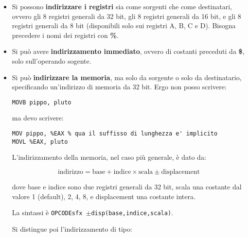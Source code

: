 \documentclass[a4paper,11pt]{article}
\begin{document}
\begin{itemize}
	\item 
Si possono \textbf{indirizzare i registri} sia come sorgenti che come destinatari, ovvero gli 8 registri generali da 32 bit, gli 8 registri generali da 16 bit, e gli 8 registri generali da 8 bit (disponibili solo sui registri A, B, C e D).
Bisogna precedere i nomi dei registri con \textbf{\%}.
	\item
Si può avere \textbf{indirizzamento immediato}, ovvero di costanti preceduti da \textbf{\$}, solo sull'operando sogente.
	\item
		Si può \textbf{indirizzare la memoria}, ma solo da sorgente o solo da destinatario, specificando un'indirizzo di memoria da 32 bit.
Ergo non posso scrivere:

\begin{lstlisting}[style=codestyle]	
MOVB pippo, pluto
\end{lstlisting}

ma devo scrivere:

\begin{lstlisting}[style=codestyle]	
MOV pippo, %EAX	% qua il suffisso di lunghezza e' implicito
MOVL %EAX, pluto
\end{lstlisting}

L'indirizzamento della memoria, nel caso più generale, è dato da: 

$$ \text{indirizzo} = \text{base} + \text{indice} \times \text{scala} \pm \text{displacement} $$

dove base e indice sono due registri generali da 32 bit, scala una costante dal valore 1 (default), 2, 4, 8, e displacement una costante intera.

La sintassi è \texttt{OPCODEsfx $\pm$disp(base,indice,scala)}.

Si distingue poi l'indirizzamento di tipo:


\end{itemize}
\end{document}

